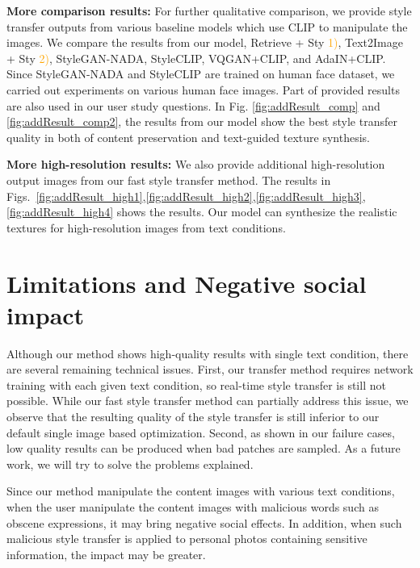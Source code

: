 \documentclass[10pt,twocolumn,letterpaper]{article}
\begin{document}
\noindent\textbf{More comparison results:} For further qualitative comparison, we provide style transfer outputs from various baseline models which use CLIP to manipulate the images. We compare the results from our model, Retrieve + Sty \textcolor{orange}{1)}, Text2Image + Sty \textcolor{orange}{2)}, StyleGAN-NADA, StyleCLIP, VQGAN+CLIP, and AdaIN+CLIP. Since StyleGAN-NADA and StyleCLIP are trained on human face dataset, we carried out experiments  on various human face images. Part of provided results are also used in our user study questions. 
In Fig. \ref{fig:addResult_comp} and \ref{fig:addResult_comp2}, the results from our model show the best style transfer quality in both of content preservation and text-guided texture synthesis.

\noindent\textbf{More high-resolution results:} We  also provide additional high-resolution output images from our fast style transfer method. The results in Figs.~\ref{fig:addResult_high1},\ref{fig:addResult_high2},\ref{fig:addResult_high3},\ref{fig:addResult_high4} shows the results. Our model can synthesize the realistic textures for high-resolution images from text conditions. 



\section{Limitations and Negative social impact}
Although our method shows high-quality results with single text condition, there are several remaining technical issues. First,  our transfer method requires network training with each given text condition, so real-time style transfer  is still not possible. 
While our fast style transfer method can partially address this issue,  we observe that the resulting  quality of the style transfer is
still inferior to our default single image based optimization. Second, as shown in our failure cases,  low quality results can be produced when bad patches are sampled. As a future work, we will try to solve the problems explained.

Since our method manipulate the content images with various text conditions, when the user manipulate the content images with malicious words such as obscene expressions, it may bring negative social effects. 
In addition, when such malicious style transfer is applied to personal photos containing sensitive information, the impact may be greater.
\end{document}
